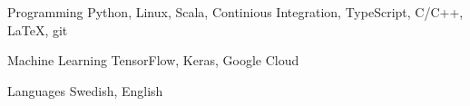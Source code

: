 


\begin{cvskills}


\cvskill
{Programming} %
{Python, Linux, Scala, Continious Integration, TypeScript, C/C++, LaTeX, git} %


\cvskill
{Machine Learning } %
{TensorFlow, Keras, Google Cloud} %


\cvskill
{Languages} %
{Swedish, English } %


\end{cvskills}
